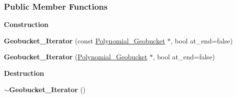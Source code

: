 \subsubsection*{Public Member Functions}
\begin{Indent}\textbf{ Construction}\par
\begin{DoxyCompactItemize}
\item 
\mbox{\label{group___iterator_group_a1cf41a066244e2f0b6919f8e1b3d799d}} 
{\bfseries Geobucket\+\_\+\+Iterator} (const \hyperlink{group__polygroup_class_polynomial___geobucket}{Polynomial\+\_\+\+Geobucket} $\ast$, bool at\+\_\+end=false)
\item 
\mbox{\label{group___iterator_group_a9aef2105e723b8c2d52f5030d437f005}} 
{\bfseries Geobucket\+\_\+\+Iterator} (\hyperlink{group__polygroup_class_polynomial___geobucket}{Polynomial\+\_\+\+Geobucket} $\ast$, bool at\+\_\+end=false)
\end{DoxyCompactItemize}
\end{Indent}
\begin{Indent}\textbf{ Destruction}\par
\begin{DoxyCompactItemize}
\item 
\mbox{\label{group___iterator_group_a474cb782876a334af8a4cd6c3f9f989c}} 
{\bfseries $\sim$\+Geobucket\+\_\+\+Iterator} ()
\end{DoxyCompactItemize}
\end{Indent}
